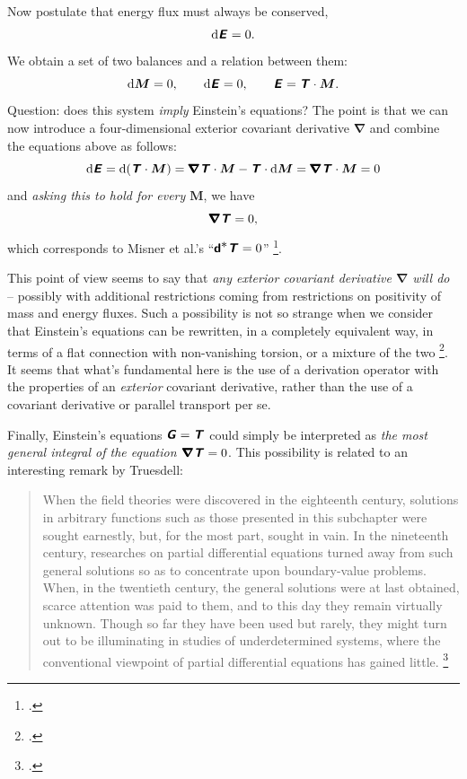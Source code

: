 \documentclass[\ifafour a4paper,12pt,\else a5paper,10pt,\fi%
onecolumn,oneside,article,%
british%
]{memoir}
\theoremstyle{remark}
\theoremstyle{innote}
\newcommand*{\mathte}[1]{\textbf{\textit{\textsf{#1}}}}
\newcommand*{\citep}{\footcites}
\newcommand*{\di}{\mathrm{d}}%
\renewcommand*{\|}[1][]{\nonscript\,#1\vert\nonscript\;\mathopen{}}
\newcommand*{\chap}{ch.}%
\newcommand*{\etal}{{et al.}}
\newcommand*{\yrr}{M}
\newcommand*{\yr}{\bm{\yrr}}
\newcommand*{\yEE}{E}
\newcommand*{\yE}{\mathte{\yEE}}
\newcommand*{\yEii}{G}
\newcommand*{\yEi}{\mathte{\yEii}}
\newcommand*{\yTTf}{T}
\newcommand*{\yTf}{\mathte{\yTTf}}
\newcommand*{\yDi}{\pmb{\bm{\nabla}}}
\begin{document}
Now postulate that energy flux must always be conserved,
\begin{equation}
  \label{eq:conserv_energy-momentum_try}
  \di\yE = 0.
\end{equation}
We obtain a set of two balances and a relation between them:
\begin{equation}
  \label{eq:massb_energyb_relation}
  \di\yr = 0, \qquad \di\yE = 0, \qquad \yE = \yTf \cdot \yr.
\end{equation}
Question: does this system \emph{imply} Einstein's equations? The point
is that we can now introduce a four-dimensional exterior covariant
derivative $\yDi$ and combine the  equations above as follows:
\begin{equation}
  \label{eq:why_4stress_zero}
     \di\yE
    = \di(\yTf \cdot \yr) 
    = \yDi\yTf \cdot \yr - \yTf \cdot \di\yr
   = \yDi\yTf \cdot \yr
    = 0
\end{equation}
and \emph{asking this to hold for every $\yr$}, we have
\begin{equation}
  \label{eq:div_T_vanishes}
  \yDi\yTf = 0,
\end{equation}
which corresponds to Misner \etal's
\enquote{$\bm{\mathsf{d}}{}^{\displaystyle *}\yTf=0$}
\citep[\chap~15]{misneretal1970_r1973}.

This point of view seems to say that \emph{any exterior covariant
  derivative $\yDi$ will do} -- possibly with additional restrictions
coming from restrictions on positivity of mass and energy fluxes. Such a
possibility is not so strange when we consider that Einstein's equations
can be rewritten, in a completely equivalent way, in terms of a flat
connection with non-vanishing torsion, or a mixture of the two
\citep{deandradeetal2000,arcosetal2004,aldrovandietal2013,pereira2014,caietal2016}.
It seems that what's fundamental here is the use of a derivation operator
with the properties of an \emph{exterior} covariant derivative, rather than
the use of a covariant derivative or parallel transport per se.

Finally, Einstein's equations $\yEi = \yTf$ could simply be interpreted as
\emph{the most general integral of the equation $\yDi\yTf = 0$}. This
possibility is related to an interesting remark by Truesdell:
\begin{quote}
  When the field theories were discovered in the eighteenth century, solutions
in arbitrary functions such as those presented in this subchapter were sought
earnestly, but, for the most part, sought in vain. In the nineteenth century,
researches on partial differential equations turned away from such general
solutions so as to concentrate upon boundary-value problems. When, in the
twentieth century, the general solutions were at last obtained, scarce attention
was paid to them, and to this day they remain virtually unknown. Though
so far they have been used but rarely, they might turn out to be illuminating
in studies of underdetermined systems, where the conventional viewpoint of
partial differential equations has gained little.  \citep[p.~594]{truesdelletal1960}
\end{quote}
\end{document}
